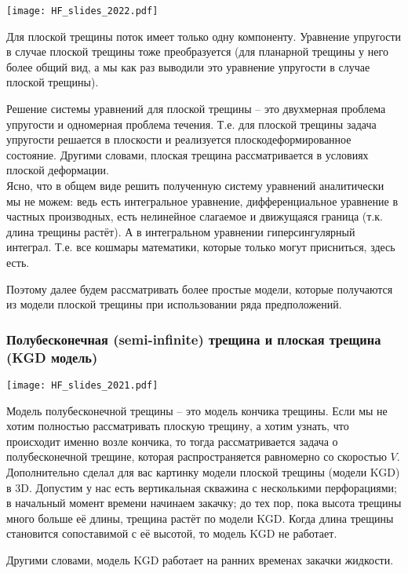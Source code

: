 \documentclass[main.tex]{subfiles}
\begin{document}
\texttt{[image: HF\_slides\_2022.pdf]}

Для плоской трещины поток имеет только одну компоненту.
Уравнение упругости в случае плоской трещины тоже преобразуется (для планарной трещины у него более общий вид, а мы как раз выводили это уравнение упругости в случае плоской трещины).

Решение системы уравнений для плоской трещины -- это двухмерная проблема упругости и одномерная проблема течения.
Т.е. для плоской трещины задача упругости решается в плоскости и реализуется плоскодеформированное состояние.
Другими словами, плоская трещина рассматривается в условиях плоской деформации.
\\

Ясно, что в общем виде решить полученную систему уравнений аналитически мы не можем: ведь есть интегральное уравнение, дифференциальное уравнение в частных производных, есть нелинейное слагаемое и движущаяся граница (т.к. длина трещины растёт).
А в интегральном уравнении гиперсингулярный интеграл.
Т.е. все кошмары математики, которые только могут присниться, здесь есть.

Поэтому далее будем рассматривать более простые модели, которые получаются из модели плоской трещины при использовании ряда предположений.

\subsubsection{Полубесконечная (semi-infinite) трещина и плоская трещина (KGD модель)}

\texttt{[image: HF\_slides\_2021.pdf]}

Модель полубесконечной трещины -- это модель кончика трещины.
Если мы не хотим полностью рассматривать плоскую трещину, а хотим узнать, что происходит именно возле кончика, то тогда рассматривается задача о полубесконечной трещине, которая распространяется равномерно со скоростью $V$.
\\

Дополнительно сделал для вас картинку модели плоской трещины (модели KGD) в 3D.
Допустим у нас есть вертикальная скважина с несколькими перфорациями; в начальный момент времени начинаем закачку; до тех пор, пока высота трещины много больше её длины, трещина растёт по модели KGD.
Когда длина трещины становится сопоставимой с её высотой, то модель KGD не работает.

Другими словами, модель KGD работает на ранних временах закачки жидкости.
\end{document}
